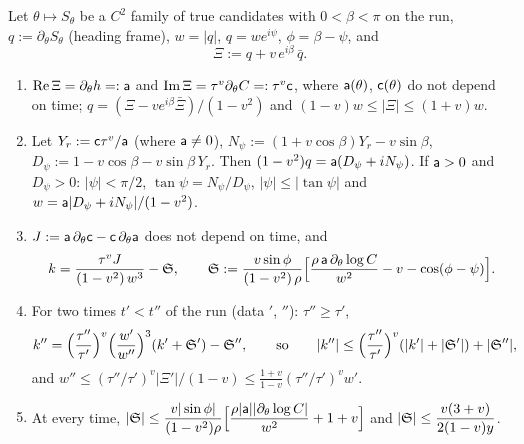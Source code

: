 \begin{lemma}[transport]\label{lem:transport}
Let $\theta\mapsto S_\theta$ be a $C^2$ family of true candidates with $0<\beta<\pi$ on the run, $q:=\partial_\theta S_\theta$
(heading frame), $w=|q|$, $q=we^{i\psi}$, $\phi=\beta-\psi$, and
\[
\Xi:=q+v\,e^{i\beta}\,\bar q .
\]
\begin{enumerate}
\item[(a)] $\operatorname{Re}\Xi=\partial_\theta h=:\mathsf a$ and $\operatorname{Im}\Xi=\tau^v\partial_\theta C=:\tau^v\mathsf c$, where
$\mathsf a(\theta)$, $\mathsf c(\theta)$ do not depend on time; $q=(\Xi-ve^{i\beta}\bar\Xi)/(1-v^2)$ and $(1-v)w\le|\Xi|\le(1+v)w$.
\item[(b)] Let $Y_r:=\mathsf c\tau^v/\mathsf a$ (where $\mathsf a\ne0$), $N_\psi:=(1+v\cos\beta)Y_r-v\sin\beta$, $D_\psi:=1-v\cos\beta-v\sin\beta\,Y_r$.
Then $(1-v^2)q=\mathsf a(D_\psi+iN_\psi)$. If $\mathsf a>0$ and $D_\psi>0$: $|\psi|<\pi/2$, $\tan\psi=N_\psi/D_\psi$, $|\psi|\le|\tan\psi|$ and
$w=\mathsf a|D_\psi+iN_\psi|/(1-v^2)$.
\item[(c)] $J:=\mathsf a\,\partial_\theta\mathsf c-\mathsf c\,\partial_\theta\mathsf a$ does not depend on time, and
\[
k=\frac{\tau^vJ}{(1-v^2)\,w^3}-\mathfrak S,\qquad
\mathfrak S:=\frac{v\sin\phi}{(1-v^2)\,\rho}\Bigl[\frac{\rho\,\mathsf a\,\partial_\theta\log C}{w^2}-v-\cos(\phi-\psi)\Bigr].
\]
\item[(d)] For two times $t'<t''$ of the run (data $'$, $''$): $\tau''\ge\tau'$,
\[
k''=\Bigl(\frac{\tau''}{\tau'}\Bigr)^v\Bigl(\frac{w'}{w''}\Bigr)^3(k'+\mathfrak S')-\mathfrak S'',\qquad\text{so}\qquad
|k''|\le\Bigl(\frac{\tau''}{\tau'}\Bigr)^v(|k'|+|\mathfrak S'|)+|\mathfrak S''|,
\]
and $w''\le(\tau''/\tau')^v|\Xi'|/(1-v)\le\frac{1+v}{1-v}(\tau''/\tau')^vw'$.
\item[(e)] At every time, $|\mathfrak S|\le\dfrac{v|\sin\phi|}{(1-v^2)\rho}\Bigl[\dfrac{\rho|\mathsf a||\partial_\theta\log C|}{w^2}+1+v\Bigr]$
and $|\mathfrak S|\le\dfrac{v(3+v)}{2(1-v)y}$.
\end{enumerate}
\end{lemma}
